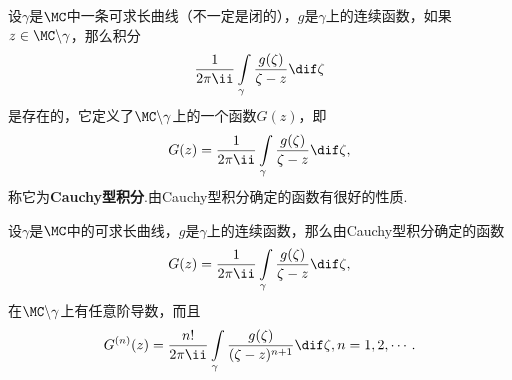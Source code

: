设$\gamma$是$\MC$中一条可求长曲线（不一定是闭的），$g$是$\gamma$上的连续函数，如果$z\in\MC\backslash\gamma$，那么积分
\[\frac1{2\pi\ii}\int\limits_\gamma\frac{g(\zeta)}{\zeta-z}\dif \zeta\]
是存在的，它定义了$\MC\backslash\gamma$上的一个函数$G(z)$，即
\[G(z)=\frac1{2\pi\ii}\int\limits_\gamma\frac{g(\zeta)}{\zeta-z}\dif \zeta,\]
称它为\textbf{Cauchy型积分}.由Cauchy型积分确定的函数有很好的性质.
\begin{theorem}\label{thm3.4.2}
设$\gamma$是$\MC$中的可求长曲线，$g$是$\gamma$上的连续函数，那么由Cauchy型积分确定的函数
\[G(z)=\frac1{2\pi\ii}\int\limits_\gamma\frac{g(\zeta)}{\zeta-z}\dif \zeta,\]
在$\MC\backslash\gamma$上有任意阶导数，而且
\begin{equation}\label{eq3.4.4}
  G^{(n)}(z)=\frac{n!}{2\pi\ii}\int\limits_\gamma\frac{g(\zeta)}{(\zeta-z)^{n+1}}\dif \zeta,n=1,2,\cdots.
\end{equation}
\end{theorem}
